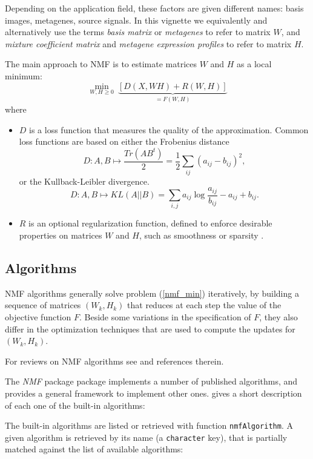 \documentclass[a4paper]{article}\usepackage{graphicx, color}
\let\code=\texttt
\newcommand{\pkgname}[1]{\textit{#1}\xspace}
\newcommand{\Rpkg}[1]{\pkgname{#1} package\xspace}
\newcommand{\nmfpack}{\Rpkg{NMF}}
\newcommand{\refeqn}[1]{(\ref{#1})}
\begin{document}
Depending on the application field, these factors are given different names: basis images, metagenes, source signals. In this vignette we equivalently and alternatively use the terms 
\emph{basis matrix} or \emph{metagenes} to refer to matrix $W$, and \emph{mixture coefficient matrix} and \emph{metagene expression profiles} to refer to matrix $H$.

The main approach to NMF is to estimate matrices $W$ and $H$ as a local minimum:
\begin{equation}\label{nmf_min}
\min_{W, H \geq 0}\ \underbrace{[D(X, WH) + R(W, H)]}_{=F(W,H)} \label{eq:optim_base}
\end{equation}
where 

\begin{itemize}
\item $D$ is a loss function that measures the quality of the approximation. 
Common loss functions are based on either the Frobenius distance 
$$D: A,B\mapsto \frac{Tr(AB^t)}{2} = \frac{1}{2} \sum_{ij} (a_{ij} - b_{ij})^2,$$
or the Kullback-Leibler divergence.
$$D: A,B\mapsto KL(A||B) = \sum_{i,j} a_{ij} \log \frac{a_{ij}}{b_{ij}} - a_{ij} + b_{ij}.$$
\item $R$ is an optional regularization function, defined to enforce desirable
properties on matrices $W$ and $H$, such as smoothness or sparsity
\cite{Cichocki2008}.
\end{itemize}

\subsection{Algorithms}
NMF algorithms generally solve problem \refeqn{nmf_min} iteratively, by building a sequence of matrices $(W_k,H_k)$ that reduces at each step the value of the objective function $F$.
Beside some variations in the specification of $F$, they also differ in the optimization techniques that are used to compute the updates for $(W_k,H_k)$.

For reviews on NMF algorithms see \cite{Berry06, Chu2004} and references therein.

The \nmfpack package implements a number of published algorithms, and provides a general framework to implement other ones.
 gives a short description of each one of the built-in algorithms:

The built-in algorithms are listed or retrieved with function \code{nmfAlgorithm}. 
A given algorithm is retrieved by its name (a \code{character} key), that is partially matched against the list of available algorithms:
\end{document}
